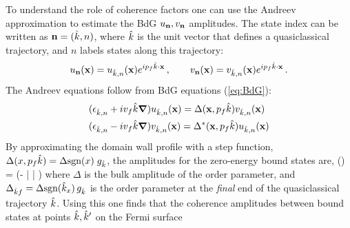 \documentclass[prb,aps,showpacs,amsmath,twocolumn,10pt]{revtex4-1}
\newcommand{\sign}{\mbox{sgn}}
\begin{document}
To understand the role of coherence factors one can use the Andreev approximation to estimate the BdG
$u_{\bf n},v_{\bf n}$ amplitudes. 
The state index can be written as ${\bf n}=(\hat{k},n)$, where $\hat{k}$ is the unit vector that defines a quasiclassical
trajectory, and $n$ labels states along this trajectory:
$$
u_{\bf n}({\bf x}) = u_{\hat{k},n}({\bf x}) e^{ip_f \hat{k} \cdot {\bf x}}  \,,
\qquad
v_{\bf n}({\bf x}) = v_{\hat{k},n}({\bf x}) e^{ip_f \hat{k} \cdot {\bf x}}  \,.
$$
The Andreev equations follow from BdG equations (\ref{eq:BdG}): 
\begin{align}
\begin{split}
& (\epsilon_{\hat{k},n} + iv_f \hat{k}\mbox{\boldmath$\nabla$}) u_{\hat{k},n}({\bf x}) = \Delta({\bf x},p_f\hat{k}) v_{\hat{k},n}({\bf x}) 
\\
& (\epsilon_{\hat{k},n} - iv_f \hat{k}\mbox{\boldmath$\nabla$}) v_{\hat{k},n}({\bf x}) = \Delta^*({\bf x},p_f\hat{k}) u_{\hat{k},n}({\bf x}) 
\end{split}
\label{eq:Andreev}
\end{align}
By approximating the domain wall profile with a step function, $\Delta(x, p_f \hk) = \Delta \sign(x) \; g_{\hk}$,
the amplitudes for the zero-energy bound states are, 
\be
\label{eq:uv_andreev}
\left[ \begin{array}{c}
u_{\hk,n} \\ v_{\hk,n}
\end{array} \right] (\vx)
=  
\left[ \begin{array}{c}
1  \\ -i \; \sign(\Delta^*_{\hk f}) 
\end{array} \right] 
\exp\left(- \left|  \right| \right)
\ee
where $\Delta$ is the bulk amplitude of the order parameter, %
and $\Delta_{\hk f} = \Delta \sign(\hk_x) \, g_{\hk}$ 
is the order parameter at the \emph{final} end of the quasiclassical trajectory $\hat{k}$. 
Using this one finds that the coherence amplitudes
between bound states at points $\hat{k}, \hat{k}'$ on the Fermi surface 
\end{document}
